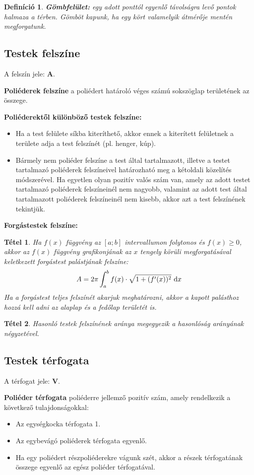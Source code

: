 \documentclass[12pt,a4paper]{article}
\newtheorem{theorem}{Tétel} [section]
\newtheorem{definition}{Definíció} [section]
\begin{document}
\begin{definition}
\textbf{Gömbfelület:} egy adott ponttól egyenlő távolságra levő pontok halmaza a térben. Gömböt kapunk, ha egy kört valamelyik átmérője mentén megforgatunk.
\end{definition}

\subsection{Testek felszíne}
A felszín jele: \textbf{A}.

\textbf{Poliéderek felszíne} a poliédert határoló véges számú sokszöglap területének az összege.

\textbf{Poliéderektől különböző testek felszíne:}
\begin{itemize}
\item Ha a test felülete síkba kiteríthető, akkor ennek a kiterített felületnek a területe adja a test felszínét (pl. henger, kúp).
\item Bármely nem poliéder felszíne a test által tartalmazott, illetve a testet tartalmazó poliéderek felszíneivel határozható meg a kétoldali közelítés módszerével. Ha egyetlen olyan pozitív valós szám van, amely az adott testet tartalmazó poliéderek felszíneinél nem nagyobb, valamint az adott test által tartalmazott poliéderek felszíneinél nem kisebb, akkor azt a test felszínének tekintjük.
\end{itemize}

\textbf{Forgástestek felszíne:}

\begin{theorem}
Ha $f(x)$ függvény az $[a; b]$ intervallumon folytonos és $f(x) \geq 0$, akkor az $f(x)$ függvény grafikonjának az $x$ tengely körüli megforgatásával keletkezett forgástest palástjának felszíne:
$$A=2\pi\int_a^bf(x)\cdot \sqrt{1+(f'(x))^2}{\normalfont\text{ d}}x$$
Ha a forgástest teljes felszínét akarjuk meghatározni, akkor a kapott palásthoz hozzá kell adni az alaplap és a fedőlap területét is.
\end{theorem}
\begin{theorem}
Hasonló testek felszínének aránya megegyezik a hasonlóság arányának négyzetével.
\end{theorem}

\subsection{Testek térfogata}
A térfogat jele: \textbf{V}.

\textbf{Poliéder térfogata} poliéderre jellemző pozitív szám, amely rendelkezik a következő tulajdonságokkal:
\begin{itemize}
\item Az egységkocka térfogata 1.
\item Az egybevágó poliéderek térfogata egyenlő.
\item Ha egy poliédert részpoliéderekre vágunk szét, akkor a részek térfogatának összege egyenlő az egész poliéder térfogatával.
\end{itemize}
\end{document}
